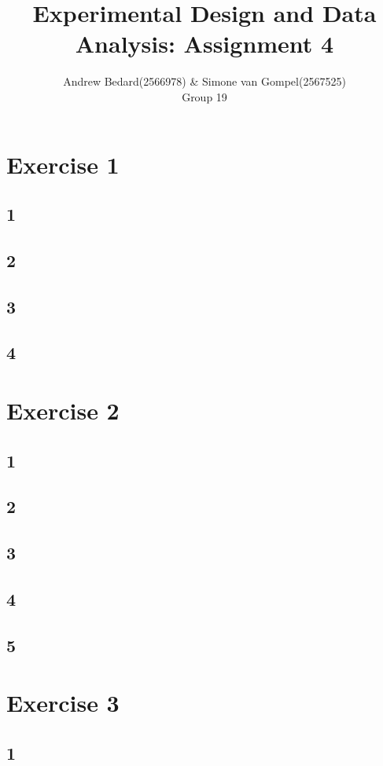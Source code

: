 \documentclass{article}
\title{Experimental Design and Data Analysis: Assignment 4}
\author{Andrew Bedard(2566978) \& Simone van Gompel(2567525) \\ Group 19}
\begin{document}
  \maketitle

  \section*{Exercise 1}
    \subsection*{1}
    \subsection*{2}
    \subsection*{3}
    \subsection*{4}
    
  \section*{Exercise 2}
    \subsection*{1}
    \subsection*{2}
    \subsection*{3}
    \subsection*{4}
    \subsection*{5}

  \section*{Exercise 3}
    \subsection*{1}
\end{document}
